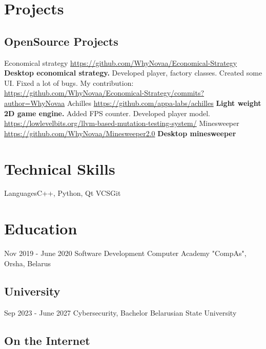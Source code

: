 \documentclass[11pt,a4paper]{moderncv}
\begin{document}
\maketitle

\section{Projects}
  \subsection{OpenSource Projects}
  \cvline
    {Economical strategy}
    {\url{https://github.com/WhyNovaa/Economical-Strategy}\newline{}
    \textbf{Desktop economical strategy.}\newline{}
    Developed player, factory classes.\newline{}
    Created some UI. \newline{}
    Fixed a lot of bugs.\newline{}
    My contribution:\newline{}
    \url{https://github.com/WhyNovaa/Economical-Strategy/commits?author=WhyNovaa}}
  \cvline
    {Achilles}
    {\url{https://github.com/appa-labs/achilles}\newline{}
    \textbf{Light weight 2D game engine.}\newline{}
    Added FPS counter.\newline{}
    Developed player model. \newline{}
    \url{https://lowlevelbits.org/llvm-based-mutation-testing-system/}
    }
  \cvline 
    {Minesweeper}
    {\url{https://github.com/WhyNovaa/Minesweeper2.0}\newline{}
    \textbf{Desktop minesweeper}\newline{}
    }
    
\section{Technical Skills}
\cvline
  {Languages}{C++, Python, Qt}
\cvline
  {VCS}{Git}

\section{Education}
  \cventry
    {Nov 2019 - June 2020}
    {Software Development}
    {Computer Academy "CompAs", Orsha, Belarus}
    {}{}{}
  \subsection{University}
  \cventry
    {Sep 2023 - June 2027}
    {Cybersecurity, Bachelor}
    {Belarusian State University}
    {}{}{}


  \subsection{On the Internet}
\end{document}
